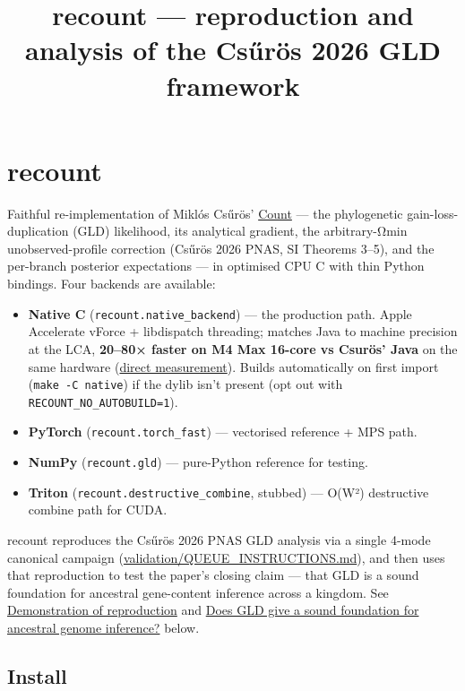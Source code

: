 \documentclass[
  10pt,
]{article}
\title{recount --- reproduction and analysis of the Csűrös 2026 GLD
framework}
\author{}
\date{}
\providecommand{\tightlist}{%
  \setlength{\itemsep}{0pt}\setlength{\parskip}{0pt}}
\begin{document}
\maketitle

{
\setcounter{tocdepth}{2}
\tableofcontents
}
\section{recount}\label{recount}

Faithful re-implementation of Miklós Csűrös'
\href{https://github.com/laszlocsuros/count}{Count} --- the phylogenetic
gain-loss-duplication (GLD) likelihood, its analytical gradient, the
arbitrary-Ωmin unobserved-profile correction (Csűrös 2026 PNAS, SI
Theorems 3--5), and the per-branch posterior expectations --- in
optimised CPU C with thin Python bindings. Four backends are available:

\begin{itemize}
\tightlist
\item
  \textbf{Native C} (\texttt{recount.native\_backend}) --- the
  production path. Apple Accelerate vForce + libdispatch threading;
  matches Java to machine precision at the LCA, \textbf{20--80× faster
  on M4 Max 16-core vs Csurös' Java} on the same hardware
  (\hyperref[performance]{direct measurement}). Builds automatically on
  first import (\texttt{make\ -C\ native}) if the dylib isn't present
  (opt out with \texttt{RECOUNT\_NO\_AUTOBUILD=1}).
\item
  \textbf{PyTorch} (\texttt{recount.torch\_fast}) --- vectorised
  reference + MPS path.
\item
  \textbf{NumPy} (\texttt{recount.gld}) --- pure-Python reference for
  testing.
\item
  \textbf{Triton} (\texttt{recount.destructive\_combine}, stubbed) ---
  O(W²) destructive combine path for CUDA.
\end{itemize}

recount reproduces the Csűrös 2026 PNAS GLD analysis via a single 4-mode
canonical campaign (\url{validation/QUEUE_INSTRUCTIONS.md}), and then
uses that reproduction to test the paper's closing claim --- that GLD is
a sound foundation for ancestral gene-content inference across a
kingdom. See \hyperref[demonstration-of-reproduction]{Demonstration of
reproduction} and
\hyperref[does-gld-give-a-sound-foundation-for-ancestral-genome-inference]{Does
GLD give a sound foundation for ancestral genome inference?} below.

\subsection{Install}\label{install}
\end{document}
